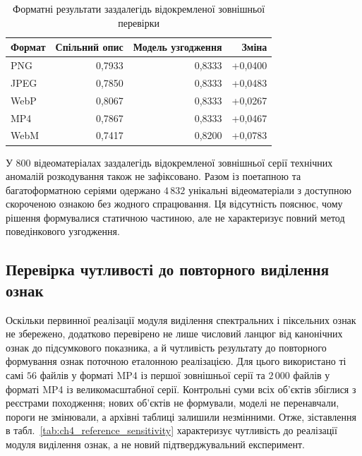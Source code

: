 \begin{table}[htbp]
\caption{Форматні результати заздалегідь відокремленої зовнішньої перевірки}
\label{tab:ch4_method2_formats}
\centering
\small
\begin{tabular}{lrrr}
\toprule
Формат & Спільний опис & Модель узгодження & Зміна \\
\midrule
PNG & 0,7933 & 0,8333 & +0,0400 \\
JPEG & 0,7850 & 0,8333 & +0,0483 \\
WebP & 0,8067 & 0,8333 & +0,0267 \\
MP4 & 0,7867 & 0,8333 & +0,0467 \\
WebM & 0,7417 & 0,8200 & +0,0783 \\
\bottomrule
\end{tabular}
\end{table}

У $800$ відеоматеріалах заздалегідь відокремленої зовнішньої серії технічних аномалій розкодування також не зафіксовано. Разом із поетапною та багатоформатною серіями одержано $4\,832$ унікальні відеоматеріали з доступною скороченою ознакою без жодного спрацювання. Ця відсутність пояснює, чому рішення формувалися статичною частиною, але не характеризує повний метод поведінкового узгодження.

\subsection{Перевірка чутливості до повторного виділення ознак}

Оскільки первинної реалізації модуля виділення спектральних і піксельних ознак не збережено, додатково перевірено не лише числовий ланцюг від канонічних ознак до підсумкового показника, а й чутливість результату до повторного формування ознак поточною еталонною реалізацією. Для цього використано ті самі $56$ файлів у форматі MP4 із першої зовнішньої серії та $2\,000$ файлів у форматі MP4 із великомасштабної серії. Контрольні суми всіх об’єктів збіглися з реєстрами походження; нових об’єктів не формували, моделі не перенавчали, пороги не змінювали, а архівні таблиці залишили незмінними. Отже, зіставлення в табл.~\ref{tab:ch4_reference_sensitivity} характеризує чутливість до реалізації модуля виділення ознак, а не новий підтверджувальний експеримент.

